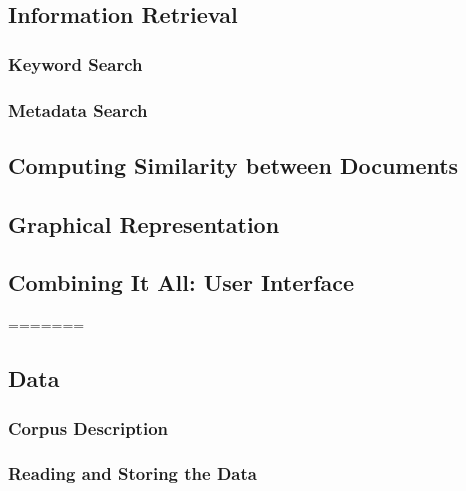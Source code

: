 
\subsection{Information Retrieval}
\label{sec:information_retrieval}

\subsubsection{Keyword Search}
\label{sec:keyword_search}

\subsubsection{Metadata Search}
\label{sec:metadata_search}

\subsection{Computing Similarity between Documents}
\label{sec:computing_similarity_between_documents}

\subsection{Graphical Representation}
\label{sec:graphical_representation}

	
\subsection{Combining It All: User Interface} 
\label{sec:combining_it_all:_user_interface}

=======
\subsection{Data}\label{sec:data}
\subsubsection{Corpus Description}\label{sec:description_of_the_castro_archive}

\subsubsection{Reading and Storing the Data}\label{sec:reading_and_storing_the_data}

